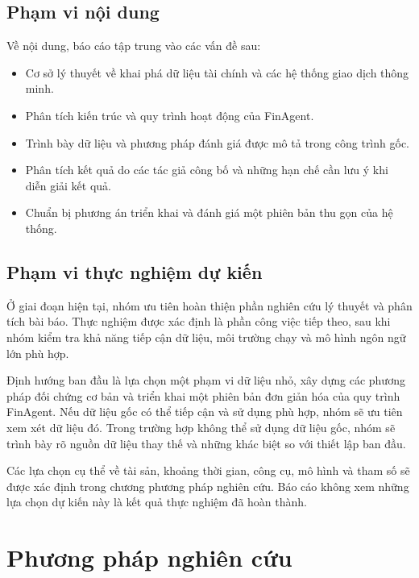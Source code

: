 \subsection{Phạm vi nội dung}

Về nội dung, báo cáo tập trung vào các vấn đề sau:

\begin{itemize}
    \item Cơ sở lý thuyết về khai phá dữ liệu tài chính và các hệ thống giao dịch thông minh.

    \item Phân tích kiến trúc và quy trình hoạt động của FinAgent.

    \item Trình bày dữ liệu và phương pháp đánh giá được mô tả trong công trình gốc.

    \item Phân tích kết quả do các tác giả công bố và những hạn chế cần lưu ý khi diễn giải kết quả.

    \item Chuẩn bị phương án triển khai và đánh giá một phiên bản thu gọn của hệ thống.
\end{itemize}

\subsection{Phạm vi thực nghiệm dự kiến}

Ở giai đoạn hiện tại, nhóm ưu tiên hoàn thiện phần nghiên cứu lý thuyết và phân tích bài báo. Thực nghiệm được xác định là phần công việc tiếp theo, sau khi nhóm kiểm tra khả năng tiếp cận dữ liệu, môi trường chạy và mô hình ngôn ngữ lớn phù hợp.

Định hướng ban đầu là lựa chọn một phạm vi dữ liệu nhỏ, xây dựng các phương pháp đối chứng cơ bản và triển khai một phiên bản đơn giản hóa của quy trình FinAgent. Nếu dữ liệu gốc có thể tiếp cận và sử dụng phù hợp, nhóm sẽ ưu tiên xem xét dữ liệu đó. Trong trường hợp không thể sử dụng dữ liệu gốc, nhóm sẽ trình bày rõ nguồn dữ liệu thay thế và những khác biệt so với thiết lập ban đầu.

Các lựa chọn cụ thể về tài sản, khoảng thời gian, công cụ, mô hình và tham số sẽ được xác định trong chương phương pháp nghiên cứu. Báo cáo không xem những lựa chọn dự kiến này là kết quả thực nghiệm đã hoàn thành.

\section{Phương pháp nghiên cứu}

